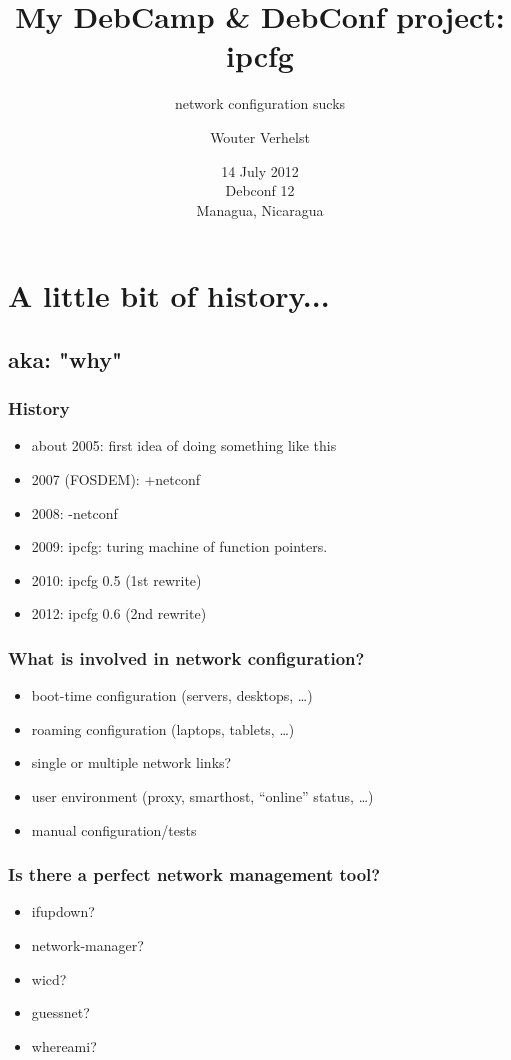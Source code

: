 \documentclass[ignorenonframetext]{beamer}
\title{My DebCamp \& DebConf project: ipcfg}
\subtitle{network configuration sucks}
\author{Wouter Verhelst}
\date{14 July 2012 \\ Debconf 12 \\ Managua, Nicaragua}
\begin{document}

\section{A little bit of history...}
\subsection{aka: "why"}
\begin{frame}
  \frametitle{History}
  \begin{itemize}
    \item about 2005: first idea of doing something like this
    \item 2007 (FOSDEM): +netconf
    \item 2008: -netconf
    \item 2009: ipcfg: turing machine of function pointers.
    \item 2010: ipcfg 0.5 (1st rewrite)
    \item 2012: ipcfg 0.6 (2nd rewrite)
  \end{itemize}
\end{frame}

\begin{frame}
  \frametitle{What is involved in network configuration?}
  \begin{itemize}
    \item boot-time configuration (servers, desktops, \ldots)
    \item roaming configuration (laptops, tablets, \ldots)
    \item single or multiple network links?
    \item user environment (proxy, smarthost, ``online'' status, \ldots)
    \item manual configuration/tests
  \end{itemize}
\end{frame}

\begin{frame}
  \frametitle{Is there a perfect network management tool?}
  \begin{itemize}
    \item ifupdown? %
    \item network-manager? %
    \item wicd? %
    \item guessnet? %
    \item whereami? %
  \end{itemize}
\end{frame}
\end{document}
